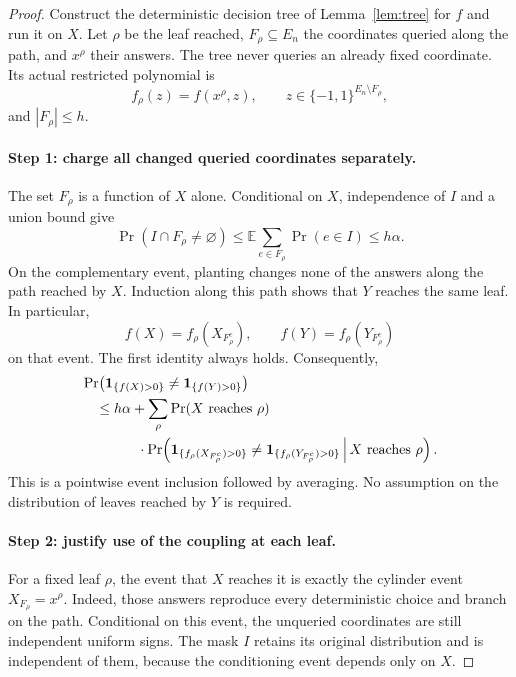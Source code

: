 \documentclass[11pt]{article}
\newcommand{\E}{\mathbb E}
\newcommand{\1}{\mathbf 1}
\theoremstyle{definition}
\theoremstyle{remark}
\numberwithin{equation}{section}
\begin{document}
\begin{proof}
Construct the deterministic decision tree of Lemma~\ref{lem:tree} for $f$ and run it on $X$. Let $\rho$ be the leaf reached, $F_\rho\subseteq E_n$ the coordinates queried along the path, and $x^\rho$ their answers. The tree never queries an already fixed coordinate. Its actual restricted polynomial is
\[
 f_\rho(z)=f(x^\rho,z),\qquad z\in\{-1,1\}^{E_n\setminus F_\rho},
\]
and $|F_\rho|\le h$.

\paragraph{Step 1: charge all changed queried coordinates separately.}
The set $F_\rho$ is a function of $X$ alone. Conditional on $X$, independence of $I$ and a union bound give
\begin{equation}\label{eq:query-hit}
 \Pr(I\cap F_\rho\ne\varnothing)
 \le\E\sum_{e\in F_\rho}\Pr(e\in I)
 \le h\alpha.
\end{equation}
On the complementary event, planting changes none of the answers along the path reached by $X$. Induction along this path shows that $Y$ reaches the same leaf. In particular,
\[
 f(X)=f_\rho(X_{F_\rho^c}),\qquad
 f(Y)=f_\rho(Y_{F_\rho^c})
\]
on that event. The first identity always holds. Consequently,
\begin{align}\label{eq:leaf-decomposition}
 &\Pr\bigl(\1_{\{f(X)>0\}}\ne\1_{\{f(Y)>0\}}\bigr)\notag\\
 &\quad\le h\alpha+
 \sum_\rho\Pr(X\text{ reaches }\rho)\notag\\
 &\qquad\qquad\cdot
 \Pr\!\left(
  \1_{\{f_\rho(X_{F_\rho^c})>0\}}
  \ne\1_{\{f_\rho(Y_{F_\rho^c})>0\}}
  \,\middle|\,X\text{ reaches }\rho\right).
\end{align}
This is a pointwise event inclusion followed by averaging. No assumption on the distribution of leaves reached by $Y$ is required.

\paragraph{Step 2: justify use of the coupling at each leaf.}
For a fixed leaf $\rho$, the event that $X$ reaches it is exactly the cylinder event $X_{F_\rho}=x^\rho$. Indeed, those answers reproduce every deterministic choice and branch on the path. Conditional on this event, the unqueried coordinates are still independent uniform signs. The mask $I$ retains its original distribution and is independent of them, because the conditioning event depends only on $X$.


\end{proof}
\end{document}
